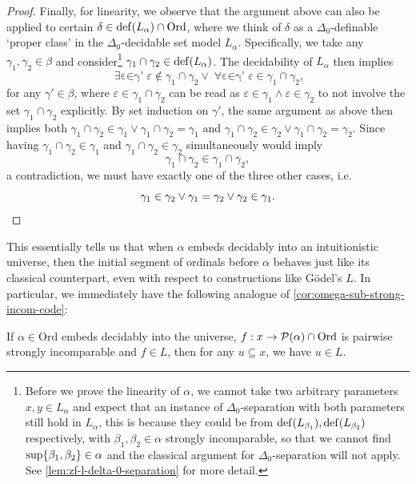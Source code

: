 \documentclass[12pt,openany]{book}
\theoremstyle{plain}
\theoremstyle{definition}
\newcommand\opA[1]{\mathop{\forall #1}}
\newcommand\opE[1]{\mathop{\exists #1}}
\newcommand\Pow{\mathcal{P}}
\DeclareMathOperator\dd{def}
\newcommand\Ord{\mathrm{Ord}}
\begin{document}
\begin{proof}
  Finally, for linearity, we observe that the argument above can also be applied to certain $\delta \in \dd\mleft(L_\alpha\mright) \cap \Ord$, where we think of $\delta$ as a $\Delta_0$-definable `proper class' in the $\Delta_0$-decidable set model $L_\alpha$. Specifically, we take any $\gamma_1, \gamma_2 \in \beta$ and consider\footnote{\label{ftn:int-l-delta-0-sep}Before we prove the linearity of $\alpha$, we cannot take two arbitrary parameters $x, y \in L_\alpha$ and expect that an instance of $\Delta_0$-separation with both parameters still hold in $L_\alpha$, this is because they could be from $\dd\mleft(L_{\beta_1}\mright), \dd\mleft(L_{\beta_2}\mright)$ respectively, with $\beta_1, \beta_2 \in \alpha$ strongly incomparable, so that we cannot find $\sup\mleft\{\beta_1, \beta_2\mright\} \in \alpha$ and the classical argument for $\Delta_0$-separation will not apply. See \autoref{lem:zf-l-delta-0-separation} for more detail.} $\gamma_1 \cap \gamma_2 \in \dd\mleft(L_\alpha\mright)$. The decidability of $L_\alpha$ then implies
  \[\opE{\varepsilon \in \gamma'} \varepsilon \not\in \gamma_1 \cap \gamma_2 \lor \opA{\varepsilon \in \gamma'} \varepsilon \in \gamma_1 \cap \gamma_2,\]
  for any $\gamma' \in \beta$, where $\varepsilon \in \gamma_1 \cap \gamma_2$ can be read as $\varepsilon \in \gamma_1 \land \varepsilon \in \gamma_2$ to not involve the set $\gamma_1 \cap \gamma_2$ explicitly. By set induction on $\gamma'$, the same argument as above then implies both $\gamma_1 \cap \gamma_2 \in \gamma_1 \lor \gamma_1 \cap \gamma_2 = \gamma_1$ and $\gamma_1 \cap \gamma_2 \in \gamma_2 \lor \gamma_1 \cap \gamma_2 = \gamma_2$. Since having $\gamma_1 \cap \gamma_2 \in \gamma_1$ and $\gamma_1 \cap \gamma_2 \in \gamma_2$ simultaneously would imply
  \[\gamma_1 \cap \gamma_2 \in \gamma_1 \cap \gamma_2,\]
  a contradiction, we must have exactly one of the three other cases, i.e.
  \[\gamma_1 \in \gamma_2 \lor \gamma_1 = \gamma_2 \lor \gamma_2 \in \gamma_1. \qedhere\]
\end{proof}

This essentially tells us that when $\alpha$ embeds decidably into an intuitionistic universe, then the initial segment of ordinals before $\alpha$ behaves just like its classical counterpart, even with respect to constructions like G\"odel's $L$. In particular, we immediately have the following analogue of \autoref{cor:omega-sub-strong-incom-code}:
\begin{corollary}
  \label{cor:dec-emb-sub-strong-incom-code}
  If $\alpha \in \Ord$ embeds decidably into the universe, $f : x \rightarrow \Pow\mleft(\alpha\mright) \cap \Ord$ is pairwise strongly incomparable and $f \in L$, then for any $u \subseteq x$, we have $u \in L$.
\end{corollary}
\end{document}
